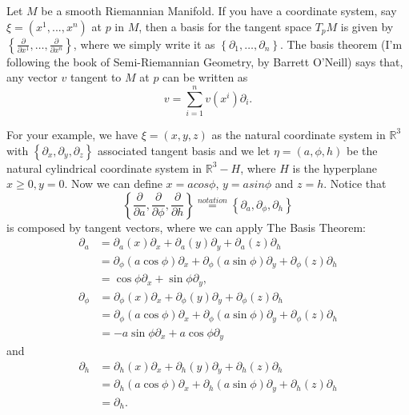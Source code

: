 \documentclass{article}
\begin{document}
Let $M$ be a smooth Riemannian Manifold. If you have a coordinate system, say $\xi=(x^{1},...,x^{n})$ at $p$ in $M$, then a basis for the tangent space $T_p M$ is given by $\left\{\frac{\partial}{\partial x^{1}}, \ldots, \frac{\partial}{\partial x^{n}}\right\}$, where we simply write it as $\left\{\partial_1, \ldots, \partial_n \right\}$. The basis theorem (I'm following the book of Semi-Riemannian Geometry, by Barrett O'Neill) says that, any vector $v$ tangent to $M$ at $p$ can be written as 
\begin{equation*}
      v = \sum_{i=1}^{n} v(x^{i}) \partial_i.
\end{equation*}

For your example, we have $\xi = (x,y,z)$ as the natural coordinate system in $\mathbb{R}^{3}$ with $\left\{\partial_x, \partial_y, \partial_z\right\}$ associated tangent basis and we let $\eta = (a,\phi,h)$ be the natural cylindrical coordinate system in $\mathbb{R}^{3} - H$, where $H$ is the hyperplane $x \geq 0, y=0$. Now we can define $x = acos\phi$, $y=asin\phi$ and $z=h$. Notice that $$\left\{\frac{\partial}{\partial a},\frac{\partial}{\partial \phi},\frac{\partial}{\partial h}\right\} \stackrel{notation}{=} \left\{\partial_a, \partial_\phi, \partial_h\right\}$$
is composed by tangent vectors, where we can apply The Basis Theorem:
\begin{align}
   \partial_a &= \partial_a(x)\partial_x + \partial_a(y)\partial_y + \partial_a(z)\partial_h\\
              &= \partial_\phi(a\cos\phi)\partial_x + \partial_\phi(a\sin\phi)\partial_y + \partial_\phi(z)\partial_h\\
              &= \cos\phi\partial_x + \sin\phi\partial_y,
\end{align}
\begin{align}
   \partial_\phi &= \partial_\phi(x)\partial_x + \partial_\phi(y)\partial_y + \partial_\phi(z)\partial_h\\
              &= \partial_\phi(a\cos\phi)\partial_x + \partial_\phi(a\sin\phi)\partial_y + \partial_\phi(z)\partial_h\\
              &= -a\sin\phi\partial_x + a\cos\phi\partial_y
\end{align}
and
\begin{align}
     \partial_h &= \partial_h(x)\partial_x + \partial_h(y)\partial_y + \partial_h(z)\partial_h\\
                &= \partial_h(a\cos\phi)\partial_x + \partial_h(a\sin\phi)\partial_y + \partial_h(z)\partial_h\\
                &= \partial_h.
\end{align}
\end{document}
